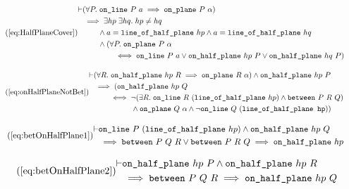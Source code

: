 \begin{equation}\tag{\ref{eq:HalfPlaneCover}}
  \begin{split}
    \vdash&(\forall P.\; \code{on\_line}\ P\ a \implies \code{on\_plane}\ P\ \alpha)\\
    &\implies \exists hp\;\exists hq.\; hp \neq hq\\
    &\qquad \wedge a = \code{line\_of\_half\_plane}\ hp \wedge a = \code{line\_of\_half\_plane}\ hq\\
    &\qquad \wedge (\forall P.\; \code{on\_plane}\ P\ \alpha\\
    &\qquad\qquad \iff \code{on\_line}\ P\ a \vee \code{on\_half\_plane}\ hp\ P \vee \code{on\_half\_plane}\ hq\ P)
  \end{split}
\end{equation}

\begin{equation}\tag{\ref{eq:onHalfPlaneNotBet}}
  \begin{split}
    \vdash&(\forall R.\; \code{on\_half\_plane}\ hp\ R \implies \code{on\_plane}\ R\ \alpha) \wedge \code{on\_half\_plane}\ hp\ P\\
    &\implies (\code{on\_half\_plane}\ hp\ Q\\
    &\qquad \iff \neg(\exists R.\; \code{on\_line}\ R\ (\code{line\_of\_half\_plane}\ hp) \wedge \between{P}{R}{Q})\\
    &\qquad\qquad\quad \wedge \code{on\_plane}\ Q\ \alpha \wedge \neg\code{on\_line}\ Q\ (\code{line\_of\_half\_plane hp}))
  \end{split}
\end{equation}

\begin{equation}\tag{\ref{eq:betOnHalfPlane1}}
  \begin{split}
    \vdash&\code{on\_line}\ P\ (\code{line\_of\_half\_plane}\ hp) \wedge \code{on\_half\_plane}\ hp\ Q\\
    &\implies \between{P}{Q}{R} \vee \between{P}{R}{Q} \implies \code{on\_half\_plane}\ hp
  \end{split}
\end{equation}

\begin{equation}\tag{\ref{eq:betOnHalfPlane2}}
  \begin{split}
    \vdash&\code{on\_half\_plane}\ hp\ P \wedge \code{on\_half\_plane}\ hp\ R\\
    &\implies \between{P}{Q}{R} \implies \code{on\_half\_plane}\ hp\ Q
  \end{split}
\end{equation}

